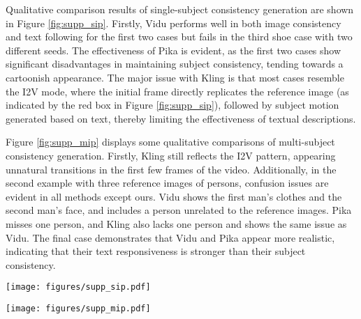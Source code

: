 Qualitative comparison results of single-subject consistency generation are shown in Figure \ref{fig:supp_sip}. Firstly, Vidu \cite{Vidu} performs well in both image consistency and text following for the first two cases but fails in the third shoe case with two different seeds. The effectiveness of Pika \cite{Pika} is evident, as the first two cases show significant disadvantages in maintaining subject consistency, tending towards a cartoonish appearance. The major issue with Kling \cite{Keling} is that most cases resemble the I2V mode, where the initial frame directly replicates the reference image (as indicated by the red box in Figure \ref{fig:supp_sip}), followed by subject motion generated based on text, thereby limiting the effectiveness of textual descriptions.

Figure \ref{fig:supp_mip} displays some qualitative comparisons of multi-subject consistency generation. Firstly, Kling still reflects the I2V pattern, appearing unnatural transitions in the first few frames of the video. Additionally, in the second example with three reference images of persons, confusion issues are evident in all methods except ours. Vidu shows the first man's clothes and the second man's face, and includes a person unrelated to the reference images. Pika misses one person, and Kling also lacks one person and shows the same issue as Vidu. The final case demonstrates that Vidu and Pika appear more realistic, indicating that their text responsiveness is stronger than their subject consistency.

\begin{figure*}[t]
	\centering
	\texttt{[image: figures/supp\_sip.pdf]} 
	\caption{Comparative results of single reference subject-to-video generation.}
	\label{fig:supp_sip}
\end{figure*}


\begin{figure*}[t]
	\centering
	\texttt{[image: figures/supp\_mip.pdf]} 
	\caption{Comparative results of multi-reference subject-to-video generation.}
	\label{fig:supp_mip}
\end{figure*}


